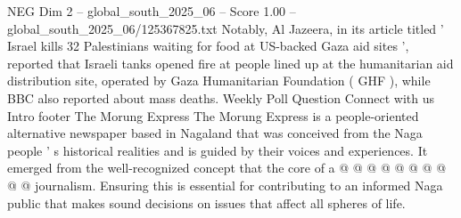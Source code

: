 \begin{textsample}{NEG Dim 2 – global\_south\_2025\_06 – Score 1.00 – global\_south\_2025\_06/125367825.txt}
Notably, Al Jazeera, in its article titled ' Israel kills 32 Palestinians waiting for food at US-backed Gaza aid sites ', reported that Israeli tanks opened fire at people lined up at the humanitarian aid distribution site, operated by Gaza Humanitarian Foundation ( GHF ), while BBC also reported about mass deaths.
Weekly Poll Question Connect with us Intro footer The Morung Express The Morung Express is a people-oriented alternative newspaper based in Nagaland that was conceived from the Naga people ' s historical realities and is guided by their voices and experiences.
It emerged from the well-recognized concept that the core of a @ @ @ @ @ @ @ @ @ @ journalism.
Ensuring this is essential for contributing to an informed Naga public that makes sound decisions on issues that affect all spheres of life.

\end{textsample}
